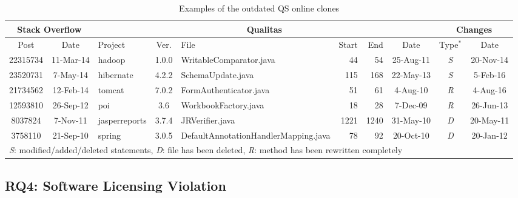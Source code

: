 \documentclass[sigconf,review, anonymous]{acmart}
\begin{document}
\begin{table}
	\centering
	\caption{Examples of the outdated QS online clones}
	\label{tab:stale_code_details}
	\small
		\begin{tabular}{cc|lcp{5.15cm}@{}rrc|c@{}c}
		 \hline
		 \multicolumn{2}{c|}{Stack Overflow} & \multicolumn{6}{c|}{Qualitas} & \multicolumn{2}{c}{Changes} \\ 
		 \hline
		 Post & Date & Project & Ver. & File & Start & End & Date & Type$^*$ & Date \\
		 \hline
		 22315734 & 11-Mar-14 & hadoop & 1.0.0 & WritableComparator.java & 44 & 54 & 25-Aug-11 & \textit{S} & 20-Nov-14 \\
		 23520731 & 7-May-14 & hibernate & 4.2.2 & SchemaUpdate.java & 115 & 168 & 22-May-13 & \textit{S} & 5-Feb-16 \\
		 21734562 & 12-Feb-14 & tomcat & 7.0.2  & FormAuthenticator.java & 51 & 61 & 4-Aug-10 & \textit{R} & 4-Aug-16 \\
		 12593810 & 26-Sep-12 & poi & 3.6 & WorkbookFactory.java & 18 & 28 & 7-Dec-09 & \textit{R} & 26-Jun-13 \\
		 8037824 & 7-Nov-11 & jasperreports & 3.7.4 & JRVerifier.java & 1221 & 1240 & 31-May-10 & \textit{D} & 20-May-11 \\
		 3758110 & 21-Sep-10 & spring & 3.0.5  & DefaultAnnotationHandlerMapping.java & 78 & 92 & 20-Oct-10 & \textit{D} & 20-Jan-12 \\
		 \hline 
		 \multicolumn{10}{l}{{\footnotesize * \textit{S}:
                  modified/added/deleted statements, \textit{D}: file
                  has been deleted,  \textit{R}: method has been
                  rewritten completely}}
		\end{tabular} %
\end{table}

\subsection{RQ4: Software Licensing Violation}
\end{document}
